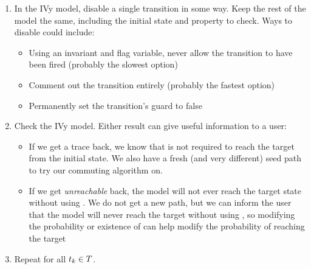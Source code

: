 \begin{enumerate}
	\item In the IVy model, disable a single transition  in some way. Keep the rest of the model the same, including the initial state and property to check. Ways to disable  could include:
	\begin{itemize}
		\item Using an invariant and flag variable, never allow the transition to have been fired (probably the slowest option)
		\item Comment out the transition entirely (probably the fastest option)
		\item Permanently set the transition's guard to false
	\end{itemize}
	\item Check the IVy model. Either result can give useful information to a user:
	\begin{itemize}
		\item If we get a trace back, we know that  is not required to reach the target from the initial state. We also have a fresh (and very different) seed path to try our commuting algorithm on.
		\item If we get \textit{unreachable} back, the model will not ever reach the target state without using . We do not get a new path, but we can inform the user that the model will never reach the target without using , so modifying the probability or existence of  can help modify the probability of reaching the target
	\end{itemize}
	\item Repeat for all $t_{k} \in T$.
\end{enumerate}